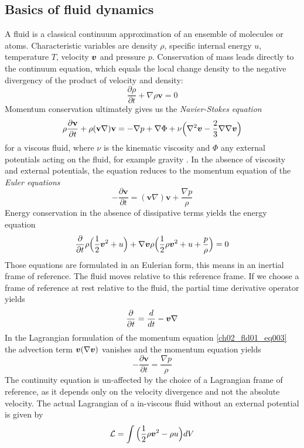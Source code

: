 \subsection{Basics of fluid dynamics}
A fluid is a classical continuum approximation of an ensemble of molecules or atoms. Characteristic variables are density $\rho$, specific internal energy $u$, temperature $T$, velocity $\boldsymbol{v}$ and pressure $p$. Conservation of mass leads directly to the continuum equation, which equals the local change density to the negative divergency of the product of velocity and density:
\begin{equation}
\label{ch02_fld01_eq001}
\frac{\partial \rho}{\partial t} +    \nabla \rho \mathbf{v} = 0
\end{equation}
Momentum conservation ultimately gives us the \emph{Navier-Stokes equation} 
\begin{equation}
\label{ch02_fld01_eq002}
\rho \frac{\partial \mathbf{v}}{\partial t} + \rho ( \mathbf{v} \nabla ) \mathbf{v} = - \nabla p + \nabla \Phi + \nu \Big( \nabla^2 \boldsymbol{v} - \frac{2}{3} \nabla \nabla \boldsymbol{v} \Big)
\end{equation}
for a viscous fluid, where $\nu$ is the kinematic viscosity and $\Phi$ any external potentials acting on the fluid, for example gravity \citep{shore2007astrophysical}. In the absence of viscosity and external potentials, the equation reduces  to the momentum equation of the \emph{Euler equations}
\begin{equation}
\label{ch02_fld01_eq003}
- \frac{\partial \mathbf{v}}{\partial t} =  ( \mathbf{v} \nabla ) \mathbf{v} + \frac{\nabla p}{\rho}
\end{equation}
Energy conservation in the absence of dissipative terms yields the energy equation
\begin{equation}
\label{ch02_fld01_eq003a}
\frac{\partial}{\partial t} \rho \Big( \frac{1}{2} \boldsymbol{v}^2 + u \Big) + \nabla \boldsymbol{v} \rho \Big( \frac{1}{2} \rho \boldsymbol{v}^2 + u + \frac{p}{\rho} \Big) = 0
\end{equation}
Those equations are formulated in an Eulerian form, this means in an inertial frame of reference. The fluid moves relative to this reference frame. If we choose a frame of reference at rest relative to the fluid, the partial time derivative operator  yields
\begin{equation}
\label{ch02_fld01_eq003c}
\frac{\partial}{\partial t} = \frac{d}{dt} - \boldsymbol{v} \nabla
\end{equation}
In the Lagrangian formulation of the momentum equation  \ref{ch02_fld01_eq003} the advection term $\boldsymbol{v} (\nabla \boldsymbol{v})$ vanishes and the momentum equation yields
\begin{equation}
\label{ch02_fld01_eq003b}
- \frac{\partial \mathbf{v}}{\partial t} = \frac{\nabla p}{\rho}
\end{equation}
The continuity equation is un-affected by the choice of a Lagrangian frame of reference, as it depends only on the velocity divergence and not the absolute velocity. The actual Lagrangian of a in-viscous fluid without an external potential is given by
\begin{equation}
\label{ch02_fld01_eq004}
\mathcal{L} = \int \Big( \frac{1}{2} \rho \boldsymbol{v} ^2 - \rho u \Big) dV
\end{equation}

